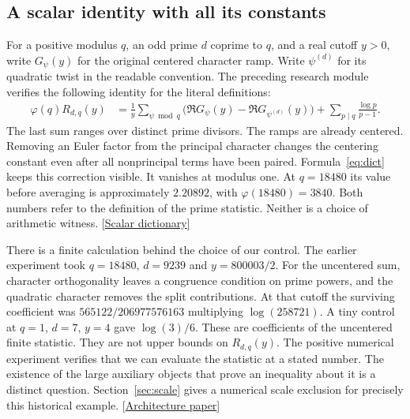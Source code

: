 \documentclass[12pt,letterpaper]{article}
\begin{document}
\subsection{A scalar identity with all its constants}
For a positive modulus $q$, an odd prime $d$ coprime to $q$, and a real cutoff $y>0$, write $G_\psi(y)$ for the original centered character ramp. Write $\psi^{(d)}$ for its quadratic twist in the readable convention. The preceding research module verifies the following identity for the literal definitions:
\begin{align}
 \varphi(q) R_{d,q}(y)
  &=\frac1y\sum_{\psi\bmod q}
       \bigl(\Re G_\psi(y)-\Re G_{\psi^{(d)}}(y)\bigr)
      +\sum_{p\mid q}\frac{\log p}{p-1}.\label{eq:dict}
\end{align}
The last sum ranges over distinct prime divisors. The ramps are already centered. Removing an Euler factor from the principal character changes the centering constant even after all nonprincipal terms have been paired. Formula~\eqref{eq:dict} keeps this correction visible. It vanishes at modulus one. At $q=18480$ its value before averaging is approximately $2.20892$, with $\varphi(18480)=3840$. Both numbers refer to the definition of the prime statistic. Neither is a choice of arithmetic witness.  {\footnotesize\sffamily\color{mute}[\href{https://github.com/nousentllc/riemann-hypothesis/blob/4cdf3cd78bfd1cdd847728aaebe5972d2ead3095/research/uriel/experiments/window-remainder-architecture/ObservableBridge.lean\#L109}{Scalar dictionary}]}

There is a finite calculation behind the choice of our control. The earlier experiment took $q=18480$, $d=9239$ and $y=800003/2$. For the uncentered sum, character orthogonality leaves a congruence condition on prime powers, and the quadratic character removes the split contributions. At that cutoff the surviving coefficient was $565122/206977576163$ multiplying $\log(258721)$. A tiny control at $q=1$, $d=7$, $y=4$ gave $\log(3)/6$. These are coefficients of the uncentered finite statistic. They are not upper bounds on $R_{d,q}(y)$. The positive numerical experiment verifies that we can evaluate the statistic at a stated number. The existence of the large auxiliary objects that prove an inequality about it is a distinct question. Section~\ref{sec:scale} gives a numerical scale exclusion for precisely this historical example.  {\footnotesize\sffamily\color{mute}[\href{https://github.com/nousentllc/riemann-hypothesis/blob/4cdf3cd78bfd1cdd847728aaebe5972d2ead3095/research/uriel/experiments/window-remainder-architecture/From_Arithmetic_Windows_to_a_Prime_Remainder.pdf}{Architecture paper}]}
\end{document}
